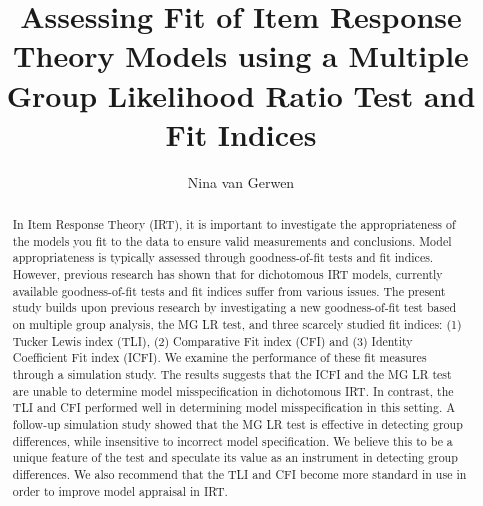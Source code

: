 \documentclass[Royal,sageapa,times,doublespace]{sagej}
\begin{document}

\title{Assessing Fit of Item Response Theory Models using a Multiple Group Likelihood Ratio Test and Fit Indices}

\author{Nina van Gerwen } %




\begin{abstract}
{\small
In Item Response Theory (IRT), it is important to investigate the appropriateness of the models you fit to the data to ensure valid measurements and conclusions. Model appropriateness is typically assessed through goodness-of-fit tests and fit indices. However, previous research has shown that for dichotomous IRT models, currently available goodness-of-fit tests and fit indices suffer from various issues. The present study builds upon previous research by investigating a new goodness-of-fit test based on multiple group analysis, the MG LR test, and three scarcely studied fit indices: (1) Tucker Lewis index (TLI), (2) Comparative Fit index (CFI) and (3) Identity Coefficient Fit index (ICFI). We examine the performance of these fit measures through a simulation study. The results suggests that the ICFI and the MG LR test are unable to determine model misspecification in dichotomous IRT. In contrast, the TLI and CFI performed well in determining model misspecification in this setting. A follow-up simulation study showed that the MG LR test is effective in detecting group differences, while insensitive to incorrect model specification. We believe this to be a unique feature of the test and speculate its value as an instrument in detecting group differences. We also recommend that the TLI and CFI become more standard in use in order to improve model appraisal in IRT. 
\par}
\end{abstract}


\maketitle
\end{document}
